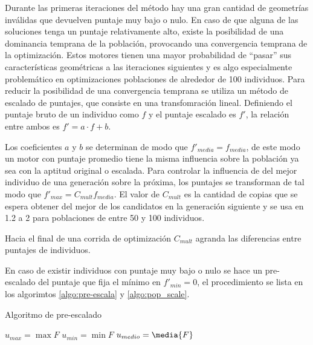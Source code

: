 Durante las primeras iteraciones del método hay una gran cantidad de geometrías
inválidas que devuelven puntaje muy bajo o nulo.
%
En caso de que alguna de las soluciones tenga un puntaje relativamente alto,
existe la posibilidad de una dominancia temprana de la población, provocando
una convergencia temprana de la optimización.
%
Estos motores tienen una mayor probabilidad de ``pasar'' sus características
geométricas a las iteraciones siguientes y es algo especialmente problemático en
optimizaciones poblaciones de alrededor de 100 individuos.
%
Para reducir la posibilidad de una convergencia temprana se utiliza un método de
escalado de puntajes, que consiste en una transfomración lineal.
%
Definiendo el puntaje bruto de un individuo como $f$ y el puntaje escalado es
$f'$, la relación entre ambos es $f' = a\cdot f + b$.

Los coeficientes $a$ y $b$ se determinan de modo que $f'_{media}=f_{media}$, de
este modo un motor con puntaje promedio tiene la misma influencia sobre la
población ya sea con la aptitud original o escalada.
%
Para controlar la influencia de  del mejor individuo de una generación sobre la
próxima, los puntajes se transforman de tal modo que
$f'_{max}=C_{mult}f_{media}$.
%
El valor de $C_{mult}$ es la cantidad de copias que se espera obtener del mejor
de los candidatos en la generación siguiente y se usa en 1.2 a 2 para
poblaciones de entre 50 y 100 individuos.

Hacia el final de una corrida de optimización $C_{mult}$ agranda las diferencias
entre puntajes de individuos.

En caso de existir individuos con puntaje muy bajo o nulo se hace un
pre-escalado del puntaje que fija el mínimo en $f'_{min}=0$, el procedimiento se
lista en los algorimtos \ref{algo:pre-escala} y \ref{algo:pop_scale}.


\begin{algorithm} \caption{Algoritmo de pre-escalado}\label{algo:pre-escala}
  \BlankLine

  $u_{max} = \max{F}$\;
  $u_{min} = \min{F}$\;
  $u_{medio} = \media{F}$\;
\end{algorithm}


